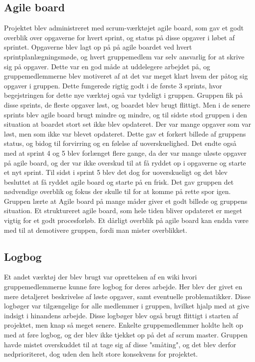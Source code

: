\subsection{Agile board}
Projektet blev administreret med scrum-værktøjet agile board, som gav et godt overblik over opgaverne for hvert sprint, og status på disse opgaver
i løbet af sprintet. Opgaverne blev lagt op på på agile boardet ved hvert sprintplanlægningsmøde, og hvert gruppemedlem var selv ansvarlig for at skrive sig på
opgaver. Dette var en god måde at uddelegere arbejdet på, og gruppemedlemmerne blev motiveret af at det var meget klart hvem der påtog sig opgaver i gruppen.
Dette fungerede rigtig godt i de første 3 sprints, hvor begejstringen for dette nye værktøj også var tydeligt i gruppen. Gruppen fik på disse sprints, de 
fleste opgaver løst, og boardet blev brugt flittigt. Men i de senere sprints blev agile board brugt mindre og mindre, og til sidste stod gruppen i den situation
at boardet stort set ikke blev opdateret. Der var mange opgaver som var løst, men som ikke var blevet opdateret. Dette gav et forkert billede af 
gruppens status, og bidog til forvirring og en følelse af uoverskuelighed. Det endte også med at sprint 4 og 5 blev forlænget flere gange, da der var mange 
uløste opgaver på agile board, og der var ikke overskud til at få ryddet op i opgaverne og starte et nyt sprint. Til sidst i sprint 5 blev det dog for uoverskueligt
og det blev besluttet at få ryddet agile board og starte på en frisk. Det gav gruppen det nødvendige overblik og fokus der skulle til for at komme på rette
spor igen. Gruppen lærte at Agile board på mange måder giver et godt billede og gruppens situation. Et struktureret agile board, som hele tiden bliver opdateret 
er meget vigtig for et godt procesforløb. Et dårligt overblik på agile board kan endda være med til at demotivere gruppen, fordi man mister overblikket.  
 
\subsection{Logbog}
Et andet værktøj der blev brugt var oprettelsen af en wiki hvori gruppemedlemmerne kunne føre logbog for deres arbejde. Her blev der givet en mere detaljeret 
beskrivelse af løste opgaver, samt eventuelle problematikker. Disse logbøger var tilgængelige for alle medlemmer i gruppen, hvilket hjalp med at give indsigt i 
hinandens arbejde. Disse logbøger blev også brugt flittigt i starten af projektet, men knap så meget senere. Enkelte gruppemedlemmer holdte helt op med at 
føre logbog, og der blev ikke tjekket op på det af scrum master. Gruppen havde mistet overskuddet til at tage sig af disse "småting", og det blev derfor
nedprioriteret, dog uden den helt store konsekvens for projektet.

